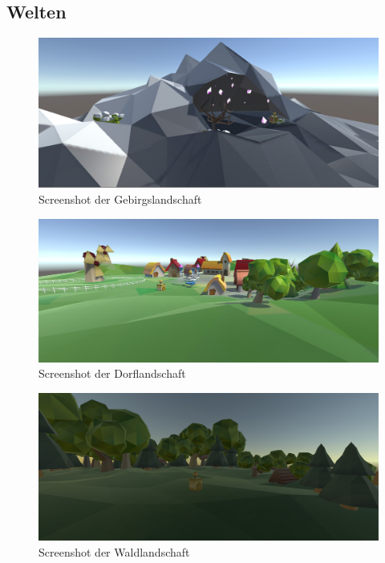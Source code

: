 \subsection{Welten}

\begin{figure}[ht]%
	\centering
		\includegraphics[width=1.0\textwidth]{images/Gebirge}
	\caption{Screenshot der Gebirgslandschaft}
	\label{fig:Gebirge}
\end{figure}


\begin{figure}[ht]%
	\centering
		\includegraphics[width=1.0\textwidth]{images/Dorf}
	\caption{Screenshot der Dorflandschaft}
	\label{fig:Dorf}
\end{figure}


\begin{figure}[ht]%
	\centering
		\includegraphics[width=1.0\textwidth]{images/Wald}
	\caption{Screenshot der Waldlandschaft}
	\label{fig:Wald}
\end{figure}

